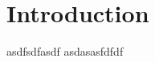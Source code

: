 \chapter{Introduction}
\label{intro}

asdfsdfasdf
\newpage
asdasasfdfdf


\renewcommand\thefigure{\thechapter .\arabic{figure}}

